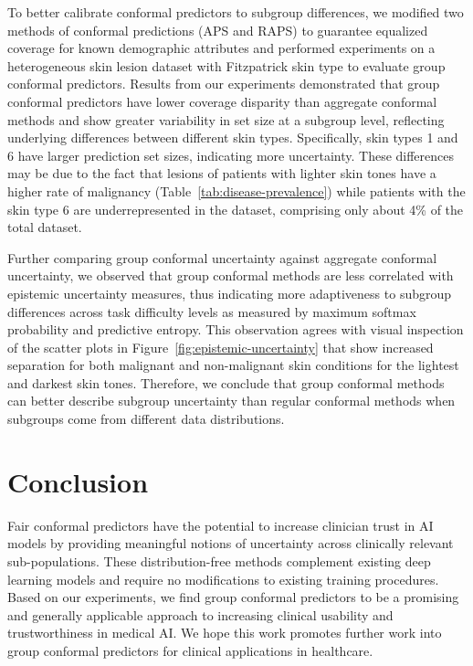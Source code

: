\documentclass[letterpaper]{article} %
\begin{document}
    To better calibrate conformal predictors to subgroup differences, we modified two methods of conformal predictions (APS and RAPS) to guarantee equalized coverage for known demographic attributes and performed experiments on a heterogeneous skin lesion dataset with Fitzpatrick skin type to evaluate group conformal predictors.
    Results from our experiments demonstrated that group conformal predictors have lower coverage disparity than aggregate conformal methods and show greater variability in set size at a subgroup level, reflecting underlying differences between different skin types. 
    Specifically, skin types 1 and 6 have larger prediction set sizes, indicating more uncertainty.
    These differences may be due to the fact that lesions of patients with lighter skin tones have a higher rate of malignancy (Table~\ref{tab:disease-prevalence}) while patients with the skin type 6 are underrepresented in the dataset, comprising only about 4\% of the total dataset.
    
    
    Further comparing group conformal uncertainty against aggregate conformal uncertainty, we observed that group conformal methods are less correlated with epistemic uncertainty measures, thus indicating more adaptiveness to subgroup differences across task difficulty levels as measured by maximum softmax probability and predictive entropy.
    This observation agrees with visual inspection of the scatter plots in Figure~\ref{fig:epistemic-uncertainty} that show increased separation for both malignant and non-malignant skin conditions for the lightest and darkest skin tones.
    Therefore, we conclude that group conformal methods can better describe subgroup uncertainty than regular conformal methods when subgroups come from different data distributions.
    
\section{Conclusion}
    Fair conformal predictors have the potential to increase clinician trust in AI models by providing meaningful notions of uncertainty across clinically relevant sub-populations.
    These distribution-free methods complement existing deep learning models and require no modifications to existing training procedures. 
    Based on our experiments, we find group conformal predictors to be a promising and generally applicable approach to increasing clinical usability and trustworthiness in medical AI.
    We hope this work promotes further work into group conformal predictors for clinical applications in healthcare.
    
\end{document}
